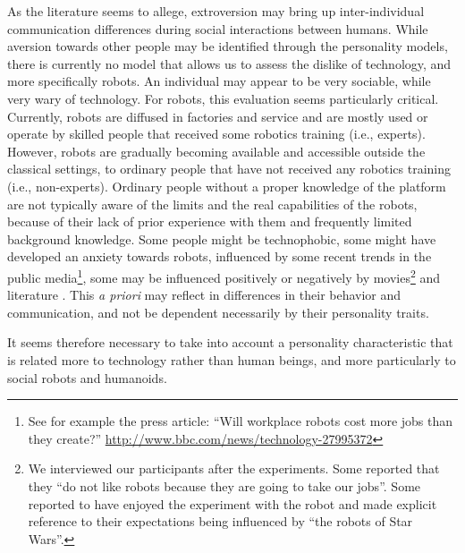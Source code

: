 \documentclass[twocolumn]{svjour3}          %
\begin{document}
As the literature seems to allege, extroversion may bring up inter-individual communication differences during social interactions between humans. While aversion towards other people may be identified through the personality models, there is currently no model that allows us to assess the dislike of technology, and more specifically robots. An individual may appear to be very sociable, while very wary of technology. 
For robots, this evaluation seems particularly critical. Currently, robots are diffused in factories and service and are mostly used or operate by skilled people that received some robotics training (i.e., experts). However, robots are gradually becoming available and accessible outside the classical settings, to ordinary people that have not received any robotics training (i.e., non-experts). Ordinary people without a proper knowledge of the platform are not typically aware of the limits and the real capabilities of the robots, because of their lack of prior experience with them and frequently limited background knowledge. 
Some people might be technophobic, some might have developed an anxiety towards robots, influenced by some recent trends in the public media\footnote{See for example the press article: ``Will workplace robots cost more jobs than they create?'' \url{http://www.bbc.com/news/technology-27995372}}, some may be influenced positively or negatively by movies\footnote{We interviewed our participants after the experiments. Some reported that they ``do not like robots because they are going to take our jobs''. Some reported to have enjoyed the experiment with the robot and made explicit reference to their expectations being influenced by ``the robots of Star Wars''.} and literature \cite{Mara2015}. This \textit{a priori} may reflect in differences in their behavior and communication, and not be dependent necessarily by their personality traits.

It seems therefore necessary to take into account a personality characteristic that is related more to technology rather than human beings, and more particularly to social robots and humanoids.
\end{document}
